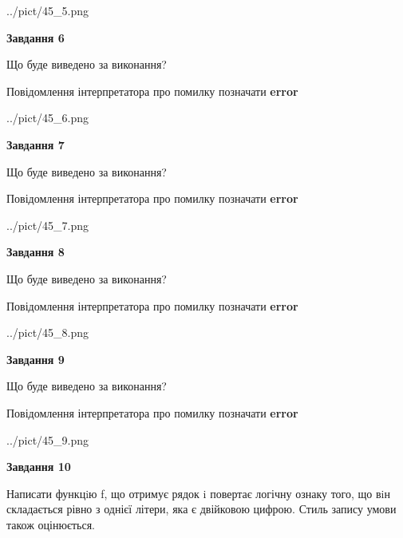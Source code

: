 \documentclass[12pt, ukrainian]{article}
\begin{document}
{\begin {large}
\begin{center}
	{../pict/45_5.png}
\end{center}
\newpage

{\begin {center}\textbf{Завдання 6}\end {center}}\par
Що буде виведено за виконання? \par
Повідомлення інтерпретатора про помилку позначати \textbf{error}

\begin{center}
	{../pict/45_6.png}
\end{center}
\newpage

{\begin {center}\textbf{Завдання 7}\end {center}}\par
Що буде виведено за виконання? \par
Повідомлення інтерпретатора про помилку позначати \textbf{error}

\begin{center}
	{../pict/45_7.png}
\end{center}
\newpage

{\begin {center}\textbf{Завдання 8}\end {center}}\par
Що буде виведено за виконання? \par
Повідомлення інтерпретатора про помилку позначати \textbf{error}

\begin{center}
	{../pict/45_8.png}
\end{center}
\newpage

{\begin {center}\textbf{Завдання 9}\end {center}}\par
Що буде виведено за виконання? \par
Повідомлення інтерпретатора про помилку позначати \textbf{error}

\begin{center}
	{../pict/45_9.png}
\end{center}
\newpage

{\begin {center}\textbf{Завдання 10}\end {center}}\par

Написати функцiю f, що отримує рядок i повертає логічну ознаку того, що вiн складається рівно з однієї літери, яка є двійковою цифрою. Стиль запису умови також оцінюється.\par
\newpage

\end {large}}
\end{document}
